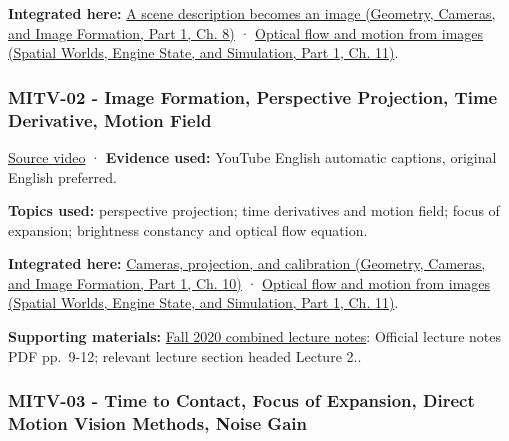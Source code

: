 \textbf{Integrated here:} \href{../03-Geometry-Cameras-and-Image-Formation-P01/main.pdf\#nameddest=03-visual-computing-i-ch001-a-scene-description-becomes-an-image}{A scene description becomes an image (Geometry, Cameras, and Image Formation, Part 1, Ch. 8)} · \href{../05-Spatial-Worlds-Engine-State-and-Simulation-P01/main.pdf\#nameddest=04-visual-computing-ii-ch030-optical-flow-and-motion-from-images}{Optical flow and motion from images (Spatial Worlds, Engine State, and Simulation, Part 1, Ch. 11)}.

\subsubsection{MITV-02 - Image Formation, Perspective Projection, Time Derivative, Motion Field}\label{04-visual-computing-ii-ch036-mitv-02---image-formation-perspective-projection-time-derivative-motion-field}

\hypertarget{04-visual-computing-ii-ch036-mitv-02---image-formation-perspective-projection-time-derivative-motion-field}{}

\href{https://www.youtube.com/watch?v=uM5AoUgCA00}{Source video} · \textbf{Evidence used:} YouTube English automatic captions, original English preferred.

\textbf{Topics used:} perspective projection; time derivatives and motion field; focus of expansion; brightness constancy and optical flow equation.

\textbf{Integrated here:} \href{../03-Geometry-Cameras-and-Image-Formation-P01/main.pdf\#nameddest=03-visual-computing-i-ch003-cameras-projection-and-calibration}{Cameras, projection, and calibration (Geometry, Cameras, and Image Formation, Part 1, Ch. 10)} · \href{../05-Spatial-Worlds-Engine-State-and-Simulation-P01/main.pdf\#nameddest=04-visual-computing-ii-ch030-optical-flow-and-motion-from-images}{Optical flow and motion from images (Spatial Worlds, Engine State, and Simulation, Part 1, Ch. 11)}.

\textbf{Supporting materials:} \href{https://ocw.mit.edu/courses/6-801-machine-vision-fall-2020/9ec44f69e72995c370b3797818ba01e6_MIT6_801F20_lectureNotes.pdf}{Fall 2020 combined lecture notes}: Official lecture notes PDF pp.~9-12; relevant lecture section headed Lecture 2..

\subsubsection{MITV-03 - Time to Contact, Focus of Expansion, Direct Motion Vision Methods, Noise Gain}\label{04-visual-computing-ii-ch036-mitv-03---time-to-contact-focus-of-expansion-direct-motion-vision-methods-noise-gain}

